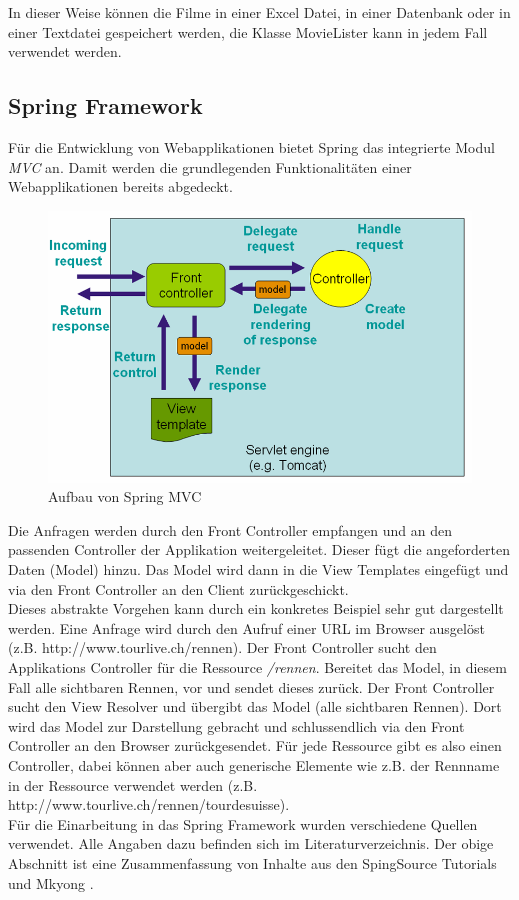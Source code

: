 In dieser Weise können die Filme in einer Excel Datei, in einer Datenbank oder in einer Textdatei gespeichert werden, die Klasse MovieLister kann in jedem Fall verwendet werden.

\subsection{Spring Framework}
Für die Entwicklung von Webapplikationen bietet Spring das integrierte Modul \textit{MVC} an. Damit werden die grundlegenden Funktionalitäten einer Webapplikationen bereits abgedeckt.

\begin{figure}[H]
	\centering
	\includegraphics[width=130mm]{images/tourliveweb/springmvc.png}
	\caption{Aufbau von Spring MVC \cite{springsourcemvc2011}}
	\label{fig:springmvc}
\end{figure}

Die Anfragen werden durch den Front Controller empfangen und an den passenden Controller der Applikation weitergeleitet. Dieser fügt die angeforderten Daten (Model) hinzu. Das Model wird dann in die View Templates eingefügt und via den Front Controller an den Client zurückgeschickt.
\\

Dieses abstrakte Vorgehen kann durch ein konkretes Beispiel sehr gut dargestellt werden. Eine Anfrage wird durch den Aufruf einer URL im Browser ausgelöst (z.B. http://www.tourlive.ch/rennen). Der Front Controller sucht den Applikations Controller für die Ressource \textit{/rennen}. Bereitet das Model, in diesem Fall alle sichtbaren Rennen, vor und sendet dieses zurück. Der Front Controller sucht den View Resolver und übergibt das Model (alle sichtbaren Rennen). Dort wird das Model zur Darstellung gebracht und schlussendlich via den Front Controller an den Browser zurückgesendet. Für jede Ressource gibt es also einen Controller, dabei können aber auch generische Elemente wie z.B. der Rennname in der Ressource verwendet werden (z.B. http://www.tourlive.ch/rennen/tourdesuisse).
\\

Für die Einarbeitung in das Spring Framework wurden verschiedene Quellen verwendet. Alle Angaben dazu befinden sich im Literaturverzeichnis. Der obige Abschnitt ist eine Zusammenfassung von Inhalte aus den SpingSource Tutorials \cite{springsourcemvc2011} und Mkyong \cite{springmvcexamples2011} .